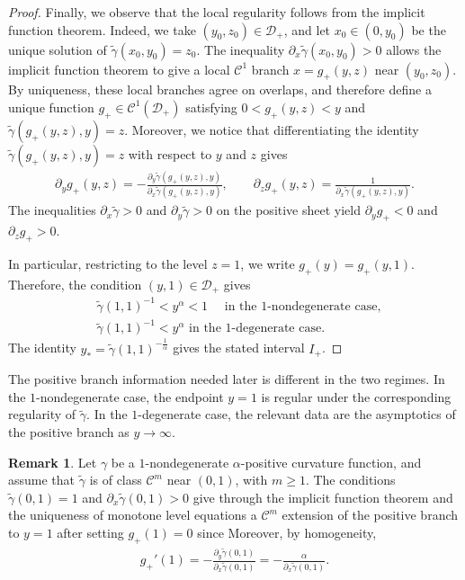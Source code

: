 \documentclass{amsart}
\theoremstyle{plain}
\theoremstyle{mainintrothm}
\theoremstyle{definition}
\newtheorem{remark}[theorem]{Remark}
\begin{document}
\begin{proof}
	Finally, we observe that the local regularity follows from the implicit function theorem.  Indeed, we take $(y_0,z_0)\in\mathcal D_+$, and let $x_0\in(0,y_0)$ be the unique solution
	of $\widetilde\gamma(x_0,y_0)=z_0$.  The inequality
	$\partial_x\widetilde\gamma(x_0,y_0)>0$ allows the implicit function theorem to give
	a local $\mathcal C^1$ branch $x=g_+(y,z)$ near $(y_0,z_0)$.  By uniqueness,
	these local branches agree on overlaps, and therefore define a unique
	function $g_+\in\mathcal C^1(\mathcal D_+)$ satisfying
	$0<g_+(y,z)<y$ and $\widetilde\gamma(g_+(y,z),y)=z$. Moreover, we notice that differentiating the identity $\widetilde\gamma(g_+(y,z),y)=z$ with respect
	to $y$ and $z$ gives
	\begin{align*}
		\partial_y g_+(y,z)
		=
		-\frac{\partial_y\widetilde\gamma(g_+(y,z),y)}
		{\partial_x\widetilde\gamma(g_+(y,z),y)},
		\qquad
		\partial_z g_+(y,z)
		=
		\frac{1}
		{\partial_x\widetilde\gamma(g_+(y,z),y)}.
	\end{align*}
	The inequalities $\partial_x\widetilde\gamma>0$ and
	$\partial_y\widetilde\gamma>0$ on the positive sheet yield
	$\partial_y g_+<0$ and $\partial_z g_+>0$.

	\medskip

	In particular, restricting to the level $z=1$, we write $g_+(y)=g_+(y,1)$.  Therefore, the condition $(y,1)\in\mathcal D_+$ gives
	\begin{align*}
		&\widetilde\gamma(1,1)^{-1}<y^\alpha<1
		\quad\text{ in the $1$-nondegenerate case},\\
		&\widetilde\gamma(1,1)^{-1}<y^\alpha
		\text{ in the $1$-degenerate case}.
	\end{align*}
	The identity
	$y_*=\widetilde\gamma(1,1)^{-\frac{1}{\alpha}}$ gives the stated
	interval $I_+$.

\end{proof}

The positive branch information needed later is different in the two regimes.
In the $1$-nondegenerate case, the endpoint $y=1$ is regular under the
corresponding regularity of $\widetilde\gamma$.  In the $1$-degenerate case,
the relevant data are the asymptotics of the positive branch as $y\to\infty$.

\begin{remark}
	\label{rem:positive-endpoint-regularity}
	Let $\gamma$ be a $1$-nondegenerate $\alpha$-positive curvature function,
	and assume that $\widetilde\gamma$ is of class $\mathcal C^m$ near $(0,1)$,
	with $m\geq1$.  The conditions $\widetilde\gamma(0,1)=1$ and
	$\partial_x\widetilde\gamma(0,1)>0$ give through the implicit function theorem  and the uniqueness of monotone level equations a $\mathcal C^m$ extension of
	the positive branch to $y=1$ after setting $g_+(1)=0$ since  
   Moreover, by homogeneity,
	\begin{align*}
		g_+'(1)
		=
		-\frac{\partial_y\widetilde\gamma(0,1)}
		{\partial_x\widetilde\gamma(0,1)}
		=
		-\frac{\alpha}{\partial_x\widetilde\gamma(0,1)}.
	\end{align*}
\end{remark}
\end{document}
